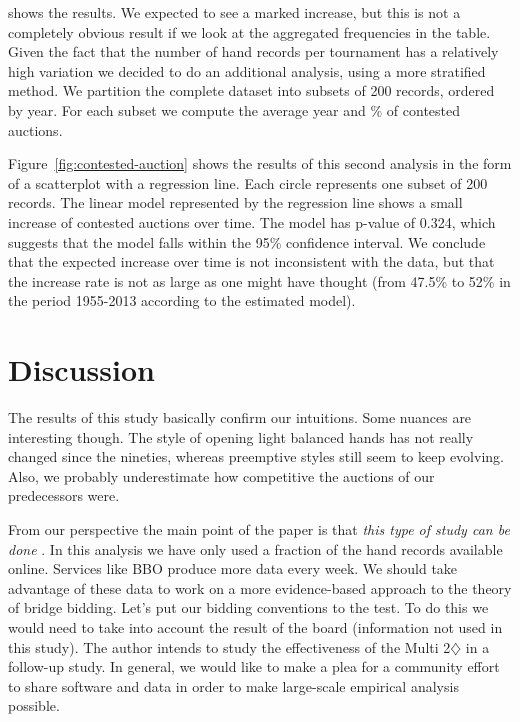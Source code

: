 \documentclass{icga}
\renewcommand{\figref}[1]{Figure~\ref{fig:#1}}
\begin{document}
 shows the results. We expected to see a
marked increase, but this is not a completely obvious result if we
look at the aggregated frequencies in the table. Given the fact that
the number of hand records per tournament has a relatively high
variation we decided to do an additional analysis, using a more
stratified method. We partition the complete dataset into subsets of
200 records, ordered by year. For each subset we compute the average
year and \% of contested auctions.


\figref{contested-auction} shows the results of this second analysis
in the form of a scatterplot with a regression line. Each circle
represents one subset of 200 records. The linear model represented by
the regression line shows a small increase of contested auctions over
time. The model has p-value of 0.324, which suggests that the model
falls within the 95\% confidence interval. We conclude that the
expected increase over time is not inconsistent with the data, but
that the increase rate is not as large as one might have thought
(from 47.5\% to 52\% in the period 1955-2013 according to the estimated model).

\section{Discussion}
\label{sec:discussion}

The results of this study basically confirm our intuitions. Some
nuances are interesting though. The style of opening light balanced
hands has not really changed since the nineties, whereas preemptive
styles still seem to keep evolving. Also, we probably underestimate
how competitive the auctions of our predecessors were.

From our perspective the main point of the paper is that \emph{this
type of study can be done} . In this analysis we have only used a
fraction of the hand records available online. Services like BBO
produce more data every week.  We should take advantage of these data
to work on a more evidence-based approach to the theory of bridge
bidding.  Let's put our bidding conventions to the test. To do this we
would need to take into account the result of the board (information
not used in this study). The author intends to study the effectiveness
of the Multi 2$\diamondsuit$ in a follow-up study.  In general, we
would like to make a plea for a community effort to share software and
data in order to make large-scale empirical analysis possible.
\end{document}
